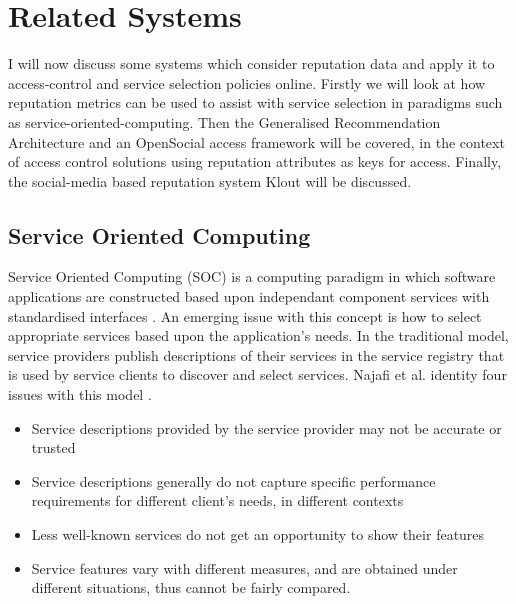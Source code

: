
\section{Related Systems}

I will now discuss some systems which consider reputation data and apply it to access-control and service selection policies online. Firstly we will look at how reputation metrics can be used to assist with service selection in paradigms such as service-oriented-computing. Then the Generalised Recommendation Architecture and an OpenSocial access framework will be covered, in the context of access control solutions using reputation attributes as keys for access. Finally, the social-media based reputation system Klout will be discussed. 


\subsection{Service Oriented Computing}

Service Oriented Computing (SOC) is a computing paradigm in which software applications are constructed based upon independant component services with standardised interfaces \cite{tsai2006introduction}. An emerging issue with this concept is how to select appropriate services based upon the application's needs. In the traditional model, service providers publish descriptions of their services in the service registry that is used by service clients to discover and select services. Najafi et al. identity four issues with this model \cite{najafi2012web}.

\begin{itemize}
 \item Service descriptions provided by the service provider may not be accurate or trusted
 \item Service descriptions generally do not capture specific performance requirements for different client's needs, in different contexts
 \item Less well-known services do not get an opportunity to show their features
 \item Service features vary with different measures, and are obtained under different situations, thus cannot be fairly compared. 
\end{itemize}

